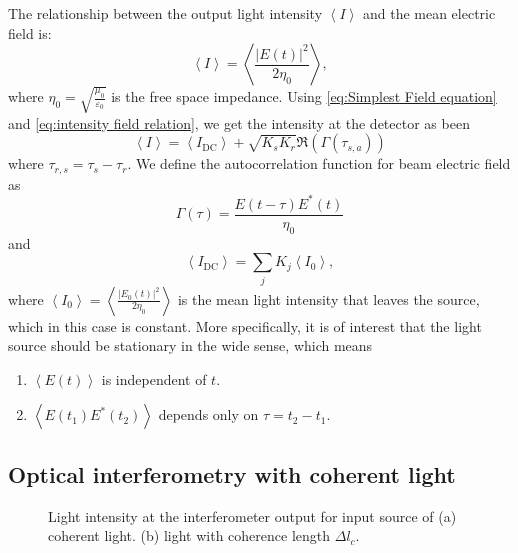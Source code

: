 \documentclass[12pt,twoside,english]{book}
\renewcommand{\~}{\perispomeni}%
\numberwithin{equation}{section}
\numberwithin{figure}{section}
\begin{document}
The relationship between the output light intensity $\left\langle I\right\rangle $ and the mean electric field is:
\begin{equation}
\left\langle I\right\rangle =\left\langle \frac{\left|E\left(t\right)\right|^{2}}{2\eta_{0}}\right\rangle ,\label{eq:intensity field relation}
\end{equation}
where $\eta_{0}=\sqrt{\frac{\mu_{0}}{\varepsilon_{0}}}$ is the free space impedance. Using \ref{eq:Simplest Field equation} and \ref{eq:intensity field relation}, we get the intensity at the detector as been
\begin{equation}
\left\langle I\right\rangle =\left\langle I_{\text{DC}}\right\rangle +\sqrt{K_{s}K_{r}}\Re\left(\Gamma\left(\tau_{s,a}\right)\right)\label{eq:michelson output intensity equation}
\end{equation}
where $\tau_{r,s}=\tau_{s}-\tau_{r}$. We define the autocorrelation function for beam electric field as
\begin{equation}
\Gamma\left(\tau\right)=\frac{E\left(t-\tau\right)E^{*}\left(t\right)}{\eta_{0}}
\label{eq:autocorrelation definition}
\end{equation}
and
\begin{equation}
\left\langle I_{\text{DC}}\right\rangle =\sum_{j}K_{j}\left\langle I_{0}\right\rangle ,
\end{equation}
where $\left\langle I_{0}\right\rangle =\left\langle \frac{\left|E_{0}\left(t\right)\right|^{2}}{2\eta_{0}}\right\rangle $ is the mean light intensity that leaves the source, which in this case is constant. More specifically, it is of interest that the light source should be stationary in the wide sense, which means
\begin{enumerate}
\item $\left\langle E\left(t\right)\right\rangle $ is independent of $t$.
\item $\left\langle E\left(t_{1}\right)E^{*}\left(t_{2}\right)\right\rangle $
depends only on $\tau=t_{2}-t_{1}$.
\end{enumerate}

\subsection{Optical interferometry with coherent light}

%
\begin{figure}[h]
\caption{Light intensity at the interferometer output for input source of (a)
coherent light. (b) light with coherence length $\Delta l_{c}$.\label{fig:interferometerGraphics}}

\end{figure}
\end{document}

